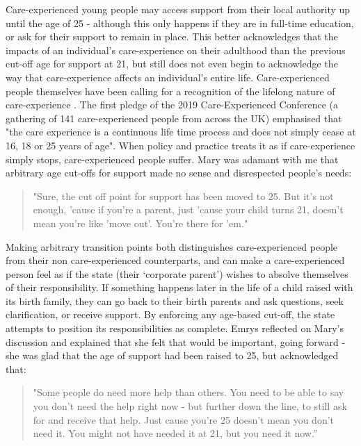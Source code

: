 Care-experienced young people may access support from their local authority up until the age of 25 - although this only happens if they are in full-time education, or ask for their support to remain in place.  This better acknowledges  that the impacts of an individual’s care-experience on their adulthood than the previous cut-off age for support at 21, but still does not even begin to acknowledge the way that care-experience affects an individual's entire life.  Care-experienced people themselves have been calling for a recognition of the lifelong nature of care-experience \citep{care-exp-conf}. The first pledge of the 2019 Care-Experienced Conference (a gathering of 141 care-experienced people from across the UK) emphasised that "the care experience is a continuous life time process and does not simply cease at 16, 18 or 25 years of age". When policy and practice treats it as if care-experience simply stops, care-experienced people suffer. Mary was adamant with me that arbitrary age cut-offs for support made no sense and disrespected people's needs:
\begin{quote}
"Sure, the cut off point for support has been moved to 25. But it's not enough, 'cause if you're a parent, just 'cause your child turns 21, doesn't mean you're like 'move out'. You're there for 'em."
\end{quote}
Making arbitrary transition points both distinguishes care-experienced people from their non care-experienced counterparts, and can make a care-experienced person feel as if the state (their ‘corporate parent’) wishes to absolve themselves of their responsibility. If something happens later in the life of a child raised with its birth family, they can go back to their birth parents and ask questions, seek clarification, or receive support. By enforcing any age-based cut-off, the state attempts to position its responsibilities as complete. Emrys reflected on Mary's discussion and explained that she felt that would be important, going forward - she was glad that the age of support had been raised to 25, but acknowledged that:
\begin{quote}
"Some people do need more help than others. You need to be able to say you don't need the help right now - but further down the line, to still ask for and receive that help. Just cause you're 25 doesn't mean you don't need it. You might not have needed it at 21, but you need it now.”
\end{quote}
